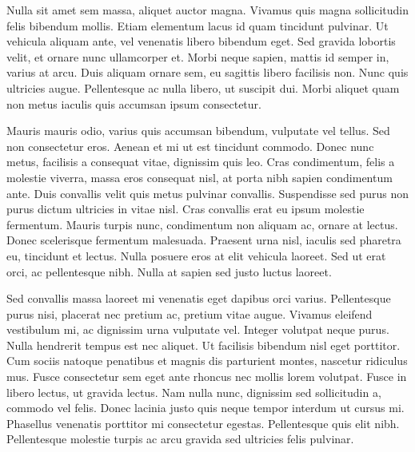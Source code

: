 Nulla sit amet sem massa, aliquet auctor magna. Vivamus quis magna sollicitudin felis bibendum mollis. Etiam elementum lacus id quam tincidunt pulvinar. Ut vehicula aliquam ante, vel venenatis libero bibendum eget. Sed gravida lobortis velit, et ornare nunc ullamcorper et. Morbi neque sapien, mattis id semper in, varius at arcu. Duis aliquam ornare sem, eu sagittis libero facilisis non. Nunc quis ultricies augue. Pellentesque ac nulla libero, ut suscipit dui. Morbi aliquet quam non metus iaculis quis accumsan ipsum consectetur.

Mauris mauris odio, varius quis accumsan bibendum, vulputate vel tellus. Sed non consectetur eros. Aenean et mi ut est tincidunt commodo. Donec nunc metus, facilisis a consequat vitae, dignissim quis leo. Cras condimentum, felis a molestie viverra, massa eros consequat nisl, at porta nibh sapien condimentum ante. Duis convallis velit quis metus pulvinar convallis. Suspendisse sed purus non purus dictum ultricies in vitae nisl. Cras convallis erat eu ipsum molestie fermentum. Mauris turpis nunc, condimentum non aliquam ac, ornare at lectus. Donec scelerisque fermentum malesuada. Praesent urna nisl, iaculis sed pharetra eu, tincidunt et lectus. Nulla posuere eros at elit vehicula laoreet. Sed ut erat orci, ac pellentesque nibh. Nulla at sapien sed justo luctus laoreet.

Sed convallis massa laoreet mi venenatis eget dapibus orci varius. Pellentesque purus nisi, placerat nec pretium ac, pretium vitae augue. Vivamus eleifend vestibulum mi, ac dignissim urna vulputate vel. Integer volutpat neque purus. Nulla hendrerit tempus est nec aliquet. Ut facilisis bibendum nisl eget porttitor. Cum sociis natoque penatibus et magnis dis parturient montes, nascetur ridiculus mus. Fusce consectetur sem eget ante rhoncus nec mollis lorem volutpat. Fusce in libero lectus, ut gravida lectus. Nam nulla nunc, dignissim sed sollicitudin a, commodo vel felis. Donec lacinia justo quis neque tempor interdum ut cursus mi. Phasellus venenatis porttitor mi consectetur egestas. Pellentesque quis elit nibh. Pellentesque molestie turpis ac arcu gravida sed ultricies felis pulvinar.